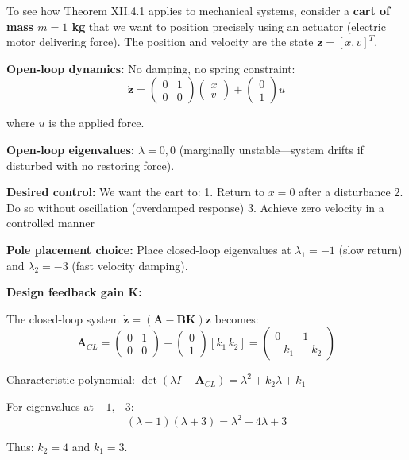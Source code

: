 \documentclass[
]{article}
\begin{document}
To see how Theorem XII.4.1 applies to mechanical systems, consider a
\textbf{cart of mass \(m = 1\) kg} that we want to position precisely
using an actuator (electric motor delivering force). The position and
velocity are the state \(\mathbf{z} = [x, v]^T\).

\textbf{Open-loop dynamics:} No damping, no spring constraint:
\[\dot{\mathbf{z}} = \begin{pmatrix} 0 & 1 \\ 0 & 0 \end{pmatrix}\begin{pmatrix} x \\ v \end{pmatrix} + \begin{pmatrix} 0 \\ 1 \end{pmatrix}u\]

where \(u\) is the applied force.

\textbf{Open-loop eigenvalues:} \(\lambda = 0, 0\) (marginally
unstable---system drifts if disturbed with no restoring force).

\textbf{Desired control:} We want the cart to: 1. Return to \(x = 0\)
after a disturbance 2. Do so without oscillation (overdamped response)
3. Achieve zero velocity in a controlled manner

\textbf{Pole placement choice:} Place closed-loop eigenvalues at
\(\lambda_1 = -1\) (slow return) and \(\lambda_2 = -3\) (fast velocity
damping).

\textbf{Design feedback gain \(\mathbf{K}\):}

The closed-loop system
\(\dot{\mathbf{z}} = (\mathbf{A} - \mathbf{BK})\mathbf{z}\) becomes:
\[\mathbf{A}_{CL} = \begin{pmatrix} 0 & 1 \\ 0 & 0 \end{pmatrix} - \begin{pmatrix} 0 \\ 1 \end{pmatrix}[k_1 \, k_2] = \begin{pmatrix} 0 & 1 \\ -k_1 & -k_2 \end{pmatrix}\]

Characteristic polynomial:
\(\det(\lambda I - \mathbf{A}_{CL}) = \lambda^2 + k_2 \lambda + k_1\)

For eigenvalues at \(-1, -3\):
\[(\lambda + 1)(\lambda + 3) = \lambda^2 + 4\lambda + 3\]

Thus: \(k_2 = 4\) and \(k_1 = 3\).
\end{document}
